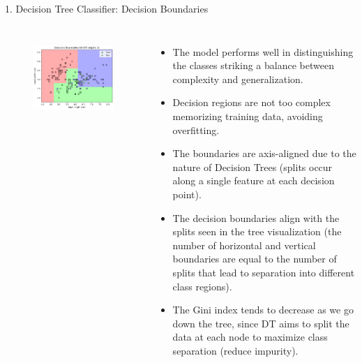 \documentclass[aspectratio=169,xcolor=dvipsnames]{beamer}
\begin{document}
\begin{frame}{1. Decision Tree Classifier: Decision Boundaries}

    \begin{columns}[c] %

        \begin{figure}
            \centering
            \includegraphics[width=1.15\linewidth]{out/plot8_DT_decision_boundaries.png}
            \label{fig:1}
        \end{figure}
        

        \begin{itemize}
            \scriptsize
            \item The model performs well in distinguishing the classes striking a balance between complexity and generalization.
            \item Decision regions are not too complex memorizing training data, avoiding overfitting.
            \item The boundaries are axis-aligned due to the nature of Decision Trees 
            (splits occur along a single feature at each decision point).
            \item The decision boundaries align with the splits seen in the tree visualization 
            (the number of horizontal and vertical boundaries are equal to the number of splits that lead to 
            separation into different class regions).
            \item The Gini index tends to decrease as we go down the tree, since DT aims to split the data at each 
            node to maximize class separation (reduce impurity).
        \end{itemize}

    \end{columns}

\end{frame}
\end{document}

